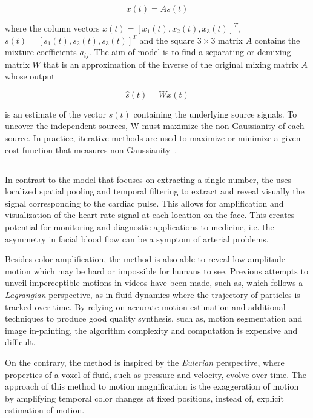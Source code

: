 \begin{equation}
  x(t) = As(t)
\end{equation}

where the column vectors $x(t) = [x_{1}(t), x_{2}(t), x_{3}(t)]^{T}$,
$s(t) = [s_{1}(t), s_{2}(t), s_{3}(t)]^{T}$ and the square $3\times3$
matrix $A$ contains the mixture coefficients $a_{ij}$. The aim of \ica{} model
is to find a separating or demixing matrix $W$ that is an approximation of the
inverse of the original mixing matrix $A$ whose output

\begin{equation}
  \hat{s}(t) = Wx(t)
\end{equation}

is an estimate of the vector $s(t)$ containing the underlying source signals.
To uncover the independent sources, W must maximize the non-Gaussianity of
each source. In practice, iterative methods are used to maximize or minimize
a given cost function that measures non-Gaussianity~\cite{Poh2010Non,
Poh2011Advancements}.

\subsection{\evm} \label{sec:sota:post:evm}


In contrast to the \ica{} model that focuses on extracting a single number,
the \evm{} uses localized spatial pooling and temporal filtering to extract
and reveal visually the signal corresponding to the cardiac pulse. This
allows for amplification and visualization of the heart rate signal at each
location on the face. This creates potential for monitoring and diagnostic
applications to medicine, i.e. the asymmetry in facial blood flow can be a
symptom of arterial problems.

Besides color amplification, the \evm{} method is also able to reveal
low-amplitude motion which may be hard or impossible for humans to see.
Previous attempts to unveil imperceptible motions in videos have been
made, such as, \cite{Liu2005Motion} which follows a \emph{Lagrangian}
perspective, as in fluid dynamics where the trajectory of particles
is tracked over time. By relying on accurate motion estimation and
additional techniques to produce good quality synthesis, such as,
motion segmentation and image in-painting, the algorithm complexity
and computation is expensive and difficult.

On the contrary, the \evm{} method is inspired by the \emph{Eulerian}
perspective, where properties of a voxel of fluid, such as pressure
and velocity, evolve over time. The approach of this method to motion
magnification is the exaggeration of motion by amplifying temporal
color changes at fixed positions, instead of, explicit estimation
of motion.

